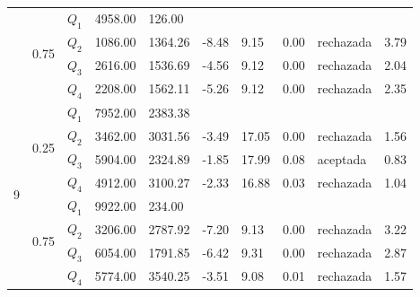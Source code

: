 \begin{table}[]
\begin{tabular}{|l|l|l|l|l|l|l|l|l|l|}
 & \multirow{4}{*}{0.75} & $Q_1$ & 4958.00 & 126.00 & \multicolumn{5}{l|}{} \\ \cline{3-10} 
 &  & $Q_2$ & 1086.00 & 1364.26 & -8.48 & 9.15 & 0.00 & rechazada & 3.79 \\ \cline{3-10} 
 &  & $Q_3$ & 2616.00 & 1536.69 & -4.56 & 9.12 & 0.00 & rechazada & 2.04 \\ \cline{3-10} 
 &  & $Q_4$ & 2208.00 & 1562.11 & -5.26 & 9.12 & 0.00 & rechazada & 2.35 \\ \hline
\multirow{8}{*}{9} & \multirow{4}{*}{0.25} & $Q_1$ & 7952.00 & 2383.38 & \multicolumn{5}{l|}{} \\ \cline{3-10} 
 &  & $Q_2$ & 3462.00 & 3031.56 & -3.49 & 17.05 & 0.00 & rechazada & 1.56 \\ \cline{3-10} 
 &  & $Q_3$ & 5904.00 & 2324.89 & -1.85 & 17.99 & 0.08 & aceptada & 0.83 \\ \cline{3-10} 
 &  & $Q_4$ & 4912.00 & 3100.27 & -2.33 & 16.88 & 0.03 & rechazada & 1.04 \\ \cline{2-10} 
 & \multirow{4}{*}{0.75} & $Q_1$ & 9922.00 & 234.00 & \multicolumn{5}{l|}{} \\ \cline{3-10} 
 &  & $Q_2$ & 3206.00 & 2787.92 & -7.20 & 9.13 & 0.00 & rechazada & 3.22 \\ \cline{3-10} 
 &  & $Q_3$ & 6054.00 & 1791.85 & -6.42 & 9.31 & 0.00 & rechazada & 2.87 \\ \cline{3-10} 
 &  & $Q_4$ & 5774.00 & 3540.25 & -3.51 & 9.08 & 0.01 & rechazada & 1.57 \\ \hline
\end{tabular}
\end{table}


